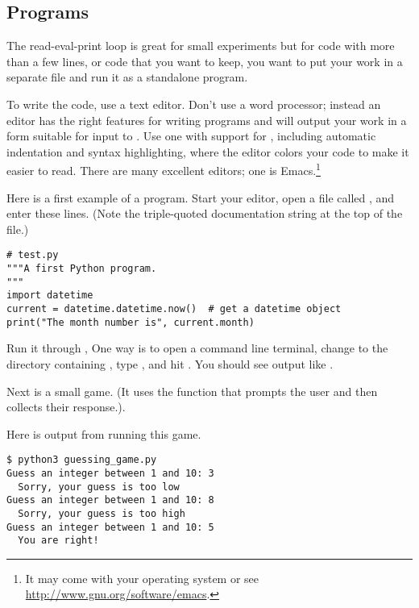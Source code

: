 \subsection{Programs}
The read-eval-print loop is great for small experiments but
for code with more than a few lines, or code that you want to
keep, you 
want to put your work in a separate file and run it as a standalone program.

To write the code, use a text editor.
Don't use a word processor; instead an editor has the right features for 
writing programs and will output your work in a form suitable for
input to \python .
Use one with support for \python{}, including
automatic indentation and  
syntax highlighting, where the editor colors your code to make it easier to
read.
There are many excellent editors; one is Emacs.\footnote{%
  It may come with your operating system or 
  see \protect\url{http://www.gnu.org/software/emacs}.}

Here is a first example of a \python{} program.
Start your editor, open a file called , and enter these lines.
(Note the triple-quoted documentation string at the top of the file.)
\begin{lstlisting}[style=python]
# test.py
"""A first Python program. 
"""
import datetime
current = datetime.datetime.now()  # get a datetime object
print("The month number is", current.month)
\end{lstlisting}
Run it through \python{},
One way is to open a command line terminal,
change to the directory containing ,  
type , and hit . 
You should see
output like .

Next is a small game. 
(It uses the \python{} function  that prompts the user
and then collects their response.).

Here is output from running this game.
\begin{lstlisting}
$ python3 guessing_game.py
Guess an integer between 1 and 10: 3
  Sorry, your guess is too low
Guess an integer between 1 and 10: 8
  Sorry, your guess is too high
Guess an integer between 1 and 10: 5
  You are right!
\end{lstlisting}  %

